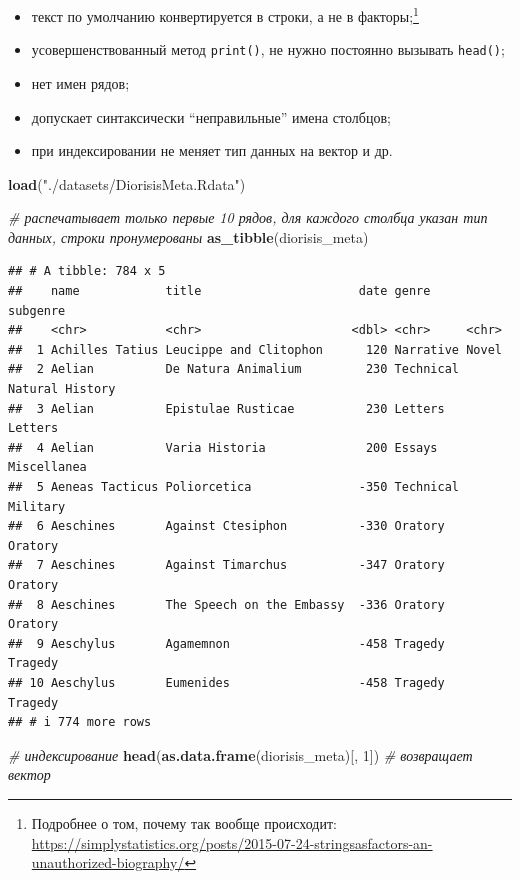 \documentclass[
]{book}
\newenvironment{Shaded}{\begin{snugshade}}{\end{snugshade}}
\newcommand{\CommentTok}[1]{\textcolor[rgb]{0.56,0.35,0.01}{\textit{#1}}}
\newcommand{\DecValTok}[1]{\textcolor[rgb]{0.00,0.00,0.81}{#1}}
\newcommand{\FunctionTok}[1]{\textcolor[rgb]{0.13,0.29,0.53}{\textbf{#1}}}
\newcommand{\NormalTok}[1]{#1}
\newcommand{\StringTok}[1]{\textcolor[rgb]{0.31,0.60,0.02}{#1}}
\providecommand{\tightlist}{%
  \setlength{\itemsep}{0pt}\setlength{\parskip}{0pt}}
\theoremstyle{definition}
\theoremstyle{definition}
\theoremstyle{definition}
\theoremstyle{definition}
\theoremstyle{remark}
\begin{document}
\begin{itemize}
\tightlist
\item
  текст по умолчанию конвертируется в строки, а не в факторы;\footnote{Подробнее о том, почему так вообще происходит: \url{https://simplystatistics.org/posts/2015-07-24-stringsasfactors-an-unauthorized-biography/}}
\item
  усовершенствованный метод \texttt{print()}, не нужно постоянно вызывать \texttt{head()};
\item
  нет имен рядов;
\item
  допускает синтаксически ``неправильные'' имена столбцов;
\item
  при индексировании не меняет тип данных на вектор и др.
\end{itemize}

\begin{Shaded}
\begin{Highlighting}[]
\FunctionTok{load}\NormalTok{(}\StringTok{"./datasets/DiorisisMeta.Rdata"}\NormalTok{)}

\CommentTok{\# распечатывает только первые 10 рядов, для каждого столбца указан тип данных, строки пронумерованы}
\FunctionTok{as\_tibble}\NormalTok{(diorisis\_meta)}
\end{Highlighting}
\end{Shaded}

\begin{verbatim}
## # A tibble: 784 x 5
##    name            title                      date genre     subgenre       
##    <chr>           <chr>                     <dbl> <chr>     <chr>          
##  1 Achilles Tatius Leucippe and Clitophon      120 Narrative Novel          
##  2 Aelian          De Natura Animalium         230 Technical Natural History
##  3 Aelian          Epistulae Rusticae          230 Letters   Letters        
##  4 Aelian          Varia Historia              200 Essays    Miscellanea    
##  5 Aeneas Tacticus Poliorcetica               -350 Technical Military       
##  6 Aeschines       Against Ctesiphon          -330 Oratory   Oratory        
##  7 Aeschines       Against Timarchus          -347 Oratory   Oratory        
##  8 Aeschines       The Speech on the Embassy  -336 Oratory   Oratory        
##  9 Aeschylus       Agamemnon                  -458 Tragedy   Tragedy        
## 10 Aeschylus       Eumenides                  -458 Tragedy   Tragedy        
## # i 774 more rows
\end{verbatim}

\begin{Shaded}
\begin{Highlighting}[]
\CommentTok{\# индексирование }
\FunctionTok{head}\NormalTok{(}\FunctionTok{as.data.frame}\NormalTok{(diorisis\_meta)[, }\DecValTok{1}\NormalTok{])  }\CommentTok{\# возвращает вектор}
\end{Highlighting}
\end{Shaded}
\end{document}
